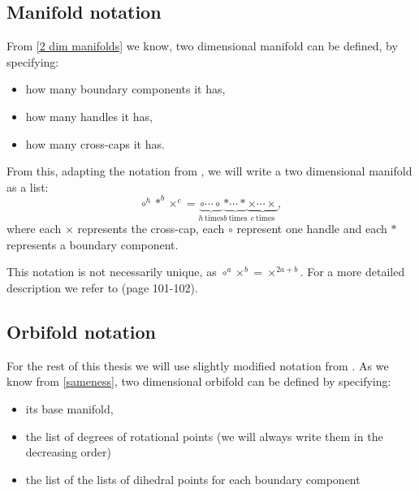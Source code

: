 \subsection{Manifold notation}
From \ref{2 dim manifolds} we know, two dimensional manifold 
can be 
defined, by specifying:
\begin{itemize}
\item how many boundary components it has,
\item how many handles it has,
\item how many cross-caps it has.
\end{itemize} 
From this, adapting the notation from \cite{Conway2016}, we will write 
a two dimensional manifold as a list: 
\begin{equation}
\circ^h*^b\times^c = \underbrace{\circ\cdots\circ}_{h\ \mathrm{times}} 
\underbrace{*\cdots*}_{b\ \mathrm{times}}\underbrace{\times\cdots \times }_{c\ \mathrm{times}},
\end{equation}
where each $\times$ represents the cross-cap, 
each $\circ$ represent one handle and each $*$ represents a boundary component.

This notation is not necessarily unique, as $\circ^a\times^b = \times^{2a+b}$. For a more 
detailed description we refer to \cite{Conway2016} (page 101-102).

\subsection{Orbifold notation}
For the rest of this thesis we will use slightly modified notation from \cite{Conway2016}.
As we know from \ref{sameness}, two dimensional orbifold can be defined 
by specifying:
\begin{itemize} 
\item its base manifold, 
\item the list of degrees of rotational points (we will 
always write them in the decreasing order) 
\item the list of the lists of dihedral points for each boundary component
\end{itemize}

